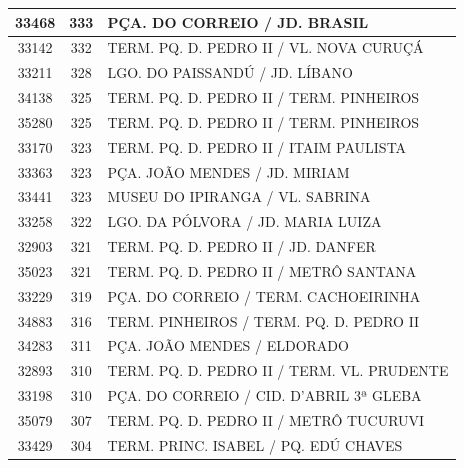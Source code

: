 \documentclass[
	12pt,				%
	oneside,			%
	a4paper,			%
	english,			%
	brazil				%
	]{abntex2ppgsi}
\begin{document}
\begin{apendicesenv}
\begin{longtable}{c|c|p{7cm}}
    33468 & 333   & PÇA. DO CORREIO / JD. BRASIL \\
\hline

    33142 & 332   & TERM. PQ. D. PEDRO II / VL. NOVA CURUÇÁ \\
\hline

    33211 & 328   & LGO. DO PAISSANDÚ / JD. LÍBANO \\
\hline

    34138 & 325   & TERM. PQ. D. PEDRO II / TERM. PINHEIROS \\
\hline

    35280 & 325   & TERM. PQ. D. PEDRO II / TERM. PINHEIROS \\
\hline

    33170 & 323   & TERM. PQ. D. PEDRO II / ITAIM PAULISTA \\
\hline

    33363 & 323   & PÇA. JOÃO MENDES / JD. MIRIAM \\
\hline

    33441 & 323   & MUSEU DO IPIRANGA / VL. SABRINA \\
\hline

    33258 & 322   & LGO. DA PÓLVORA / JD. MARIA LUIZA \\
\hline

    32903 & 321   & TERM. PQ. D. PEDRO II / JD. DANFER \\
\hline

    35023 & 321   & TERM. PQ. D. PEDRO II / METRÔ SANTANA \\
\hline

    33229 & 319   & PÇA. DO CORREIO / TERM. CACHOEIRINHA \\
\hline

    34883 & 316   & TERM. PINHEIROS / TERM. PQ. D. PEDRO II \\
\hline

    34283 & 311   & PÇA. JOÃO MENDES / ELDORADO \\
\hline

    32893 & 310   & TERM. PQ. D. PEDRO II / TERM. VL. PRUDENTE \\
\hline

    33198 & 310   & PÇA. DO CORREIO / CID. D'ABRIL 3ª GLEBA \\
\hline

    35079 & 307   & TERM. PQ. D. PEDRO II / METRÔ TUCURUVI \\
\hline

    33429 & 304   & TERM. PRINC. ISABEL / PQ. EDÚ CHAVES \\
\hline


\end{longtable}
\end{apendicesenv}
\end{document}

